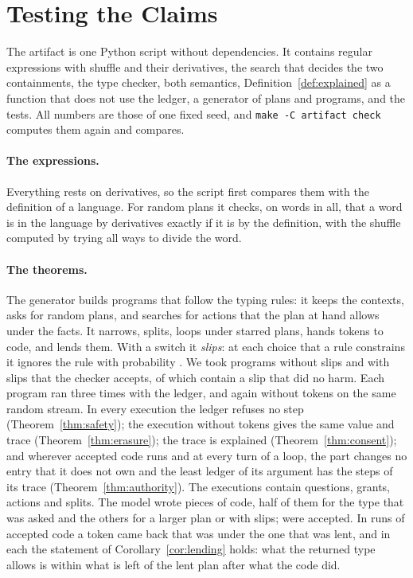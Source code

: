 \documentclass[acmsmall,nonacm,screen]{acmart}
\begin{document}
\section{Testing the Claims}
\label{sec:tests}

The artifact is one Python script without dependencies. It contains regular expressions with
shuffle and their derivatives, the search that decides the two containments, the type
checker, both semantics, Definition~\ref{def:explained} as a function that does not use the
ledger, a generator of plans and programs, and the tests. All numbers are those of one fixed
seed, and \texttt{make -C artifact check} computes them again and compares.

\paragraph{The expressions.} Everything rests on derivatives, so the script first compares
them with the definition of a language. For \exEnginePlans{} random plans it checks, on
\exEngineWords{} words in all, that a word is in the language by derivatives exactly if it
is by the definition, with the shuffle computed by trying all ways to divide the word.

\paragraph{The theorems.} The generator builds programs that follow the typing rules: it
keeps the contexts, asks for random plans, and searches for actions that the plan at hand
allows under the facts. It narrows, splits, loops under starred plans, hands tokens to code,
and lends them. With a switch it \emph{slips}: at each choice that a rule constrains it
ignores the rule with probability \exSlip{}. We took \exTyped{} programs without slips and
\exTyped{} with slips that the checker accepts, of which \exLucky{} contain a slip that did
no harm. Each program ran three times with the ledger, and again without tokens on the same
random stream. In every execution the ledger refuses no step
(Theorem~\ref{thm:safety}); the execution without tokens gives the same value and trace
(Theorem~\ref{thm:erasure}); the trace is explained (Theorem~\ref{thm:consent}); and wherever
accepted code runs and at every turn of a loop, the part changes no entry that it does not
own and the least ledger of its argument has the steps of its trace
(Theorem~\ref{thm:authority}). The \exRuns{} executions contain \exAsks{} questions,
\exGrants{} grants, \exActs{} actions and \exSplits{} splits. The model wrote \exWritten{}
pieces of code, half of them for the type that was asked and the others for a larger plan
or with slips; \exAccepted{} were accepted. In \exLent{} runs of accepted code a token came
back that was under the one that was lent, and in each the statement of
Corollary~\ref{cor:lending} holds: what the returned type allows is within what is left of
the lent plan after what the code did.
\end{document}
